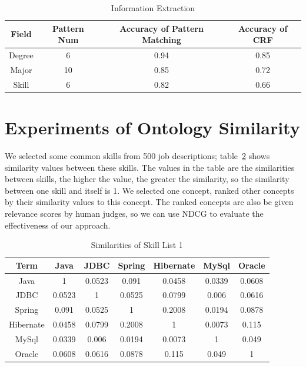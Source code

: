 \begin{table}[ht]
\caption{Information Extraction} %
\centering %
\begin{tabular}{   | c | c | c | c |   }
 \hline
          Field   & Pattern Num & Accuracy of Pattern Matching  & Accuracy of CRF   \\
 \hline
          Degree  & 6           & 0.94       &  0.85  \\
 \hline
          Major   & 10          & 0.85       &  0.72  \\
 \hline
          Skill   & 6           & 0.82       &  0.66  \\
 \hline
\end{tabular}
\label{tab:ieaccura} %
\end{table}

\section{Experiments of Ontology Similarity}

We selected some common skills from 500 job descriptions; table~\ref{tab:dismatrix3} shows similarity values between these skills. The values in the table are the similarities between skills, the higher the value, the greater the similarity, so the similarity between one skill and itself is 1. We selected one concept, ranked other concepts by their similarity values to this concept. The ranked concepts are also be given relevance scores by human judges, so we can use NDCG to evaluate the effectiveness of our approach.

\begin{table}

\caption{Similarities of Skill List 1}
\begin{tabular}{ c | c c c c c c   }
 \hline
  Term       &  Java  &  JDBC  & Spring & Hibernate & MySql  & Oracle   \\  \hline
  Java   &   1    & 0.0523 & 0.091  &   0.0458  & 0.0339 & 0.0608    \\  \hline
    JDBC   & 0.0523 &   1    & 0.0525 &   0.0799  & 0.006  & 0.0616   \\  \hline
   Spring  & 0.091  & 0.0525 &   1    &   0.2008  & 0.0194 & 0.0878   \\  \hline
 Hibernate & 0.0458 & 0.0799 & 0.2008 &     1     & 0.0073 & 0.115    \\  \hline
   MySql   & 0.0339 & 0.006  & 0.0194 &   0.0073  &   1    & 0.049    \\  \hline
   Oracle  & 0.0608 & 0.0616 & 0.0878 &   0.115   & 0.049  &   1      \\  \hline
 \hline
\end{tabular}
\label{tab:dismatrix3}
\end{table}

